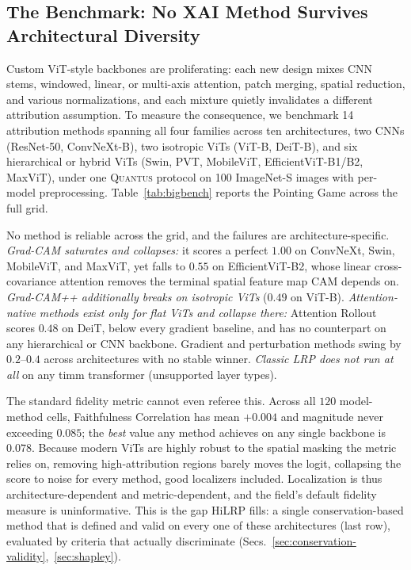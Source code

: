 \documentclass[lettersize,journal]{IEEEtran}
\begin{document}
\subsection{The Benchmark: No XAI Method Survives Architectural Diversity}
\label{sec:baseline-landscape}
Custom ViT-style backbones are proliferating: each new design mixes CNN stems, windowed, linear, or multi-axis attention, patch merging, spatial reduction, and various normalizations, and each mixture quietly invalidates a different attribution assumption. To measure the consequence, we benchmark 14 attribution methods spanning all four families across ten architectures, two CNNs (ResNet-50, ConvNeXt-B), two isotropic ViTs (ViT-B, DeiT-B), and six hierarchical or hybrid ViTs (Swin, PVT, MobileViT, EfficientViT-B1/B2, MaxViT), under one \textsc{Quantus} protocol on 100 ImageNet-S images with per-model preprocessing. Table~\ref{tab:bigbench} reports the Pointing Game across the full grid.

No method is reliable across the grid, and the failures are architecture-specific. \emph{Grad-CAM saturates and collapses:} it scores a perfect $1.00$ on ConvNeXt, Swin, MobileViT, and MaxViT, yet falls to $0.55$ on EfficientViT-B2, whose linear cross-covariance attention removes the terminal spatial feature map CAM depends on. \emph{Grad-CAM++ additionally breaks on isotropic ViTs} ($0.49$ on ViT-B). \emph{Attention-native methods exist only for flat ViTs and collapse there:} Attention Rollout scores $0.48$ on DeiT, below every gradient baseline, and has no counterpart on any hierarchical or CNN backbone. Gradient and perturbation methods swing by $0.2$--$0.4$ across architectures with no stable winner. \emph{Classic LRP does not run at all} on any timm transformer (unsupported layer types).

The standard fidelity metric cannot even referee this. Across all $120$ model-method cells, Faithfulness Correlation has mean $+0.004$ and magnitude never exceeding $0.085$; the \emph{best} value any method achieves on any single backbone is $0.078$. Because modern ViTs are highly robust to the spatial masking the metric relies on, removing high-attribution regions barely moves the logit, collapsing the score to noise for every method, good localizers included. Localization is thus architecture-dependent and metric-dependent, and the field's default fidelity measure is uninformative. This is the gap HiLRP fills: a single conservation-based method that is defined and valid on every one of these architectures (last row), evaluated by criteria that actually discriminate (Secs.~\ref{sec:conservation-validity},~\ref{sec:shapley}).
\end{document}
